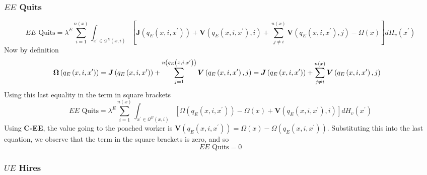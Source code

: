 \subsubsection{$EE$ Quits}

\begin{equation*}
\text{$EE$ Quits}=\lambda ^{E}\sum\limits_{i=1}^{n\left( x\right)
}\int_{x^{\prime }\in \mathcal{Q}^{E}\left( x,i\right) }\left[ \boldsymbol{J}%
\left( q_{E}\left( x,i,x^{\prime }\right) \right) +\boldsymbol{V}\left(
q_{E}\left( x,i,x^{\prime }\right) ,i\right) +\sum_{j\neq i}^{n\left(
x\right) }\boldsymbol{V}\left( q_{E}\left( x,i,x^{\prime }\right) ,j\right)
-\Omega \left( x\right) \right] dH_v\left( x^{\prime }\right)
\end{equation*}%
Now by definition
\begin{align*}
\boldsymbol{\Omega }\left( q_{E}\left( x,i,x^{\prime }\right) \right) & =\boldsymbol{%
J}\left( q_{E}\left( x,i,x^{\prime }\right) \right) +\sum_{j=1}^{n\left(
q_{E}\left( x,i,x^{\prime }\right) \right) }\boldsymbol{V}\left( q_{E}\left(
x,i,x^{\prime }\right) ,j\right)  =\boldsymbol{J}\left( q_{E}\left( x,i,x^{\prime }\right) \right) +\sum_{j\neq
i}^{n\left( x\right) }\boldsymbol{V}\left( q_{E}\left( x,i,x^{\prime }\right)
,j\right)
\end{align*}%
Using this last equality in the term in square brackets
\begin{equation*}
\text{$EE$ Quits}=\lambda ^{E}\sum\limits_{i=1}^{n\left( x\right)
}\int_{x^{\prime }\in \mathcal{Q}^{E}\left( x,i\right) }\left[ \Omega \left(
q_{E}\left( x,i,x^{\prime }\right) \right) -\Omega \left( x\right) +\boldsymbol{V%
}\left( q_{E}\left( x,i,x^{\prime }\right) ,i\right) \right] dH_v\left(
x^{\prime }\right)
\end{equation*}%
Using \textbf{C-EE}, the value going to the poached worker is \textbf{$%
\boldsymbol{V}\left( q_{E}\left( x,i,x^{\prime }\right) \right) =\Omega \left(
x\right) -\Omega \left( q_{E}\left( x,i,x^{\prime }\right) \right) $}.
Substituting this into the last equation, we observe that the term in the
square brackets is zero, and so
\begin{equation*}
\text{$EE$ Quits}=0
\end{equation*}

\subsubsection{$UE$ Hires}

